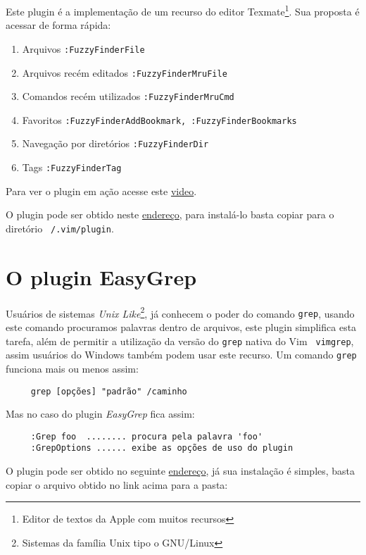 Este plugin é a implementação de um recurso do editor 
Texmate\footnote{Editor de textos da Apple com muitos recursos}.
Sua proposta é acessar de forma rápida:


\begin{enumerate}
\item Arquivos \verb|:FuzzyFinderFile|
\item Arquivos recém editados \verb|:FuzzyFinderMruFile|
\item Comandos recém utilizados \verb|:FuzzyFinderMruCmd|
\item Favoritos \verb|:FuzzyFinderAddBookmark, :FuzzyFinderBookmarks|
\item Navegação por diretórios \verb|:FuzzyFinderDir|
\item Tags {\tt :FuzzyFinderTag}
\end{enumerate}

Para ver o plugin em ação acesse este
\href{http://vimeo.com/2938498}{video}.


O plugin pode ser obtido neste
\href{http://www.vim.org/scripts/script.php?script\_id=1984}{endereço},
para instalá-lo basta copiar para o diretório 
{\tt ~/.vim/plugin}.

\section{O plugin EasyGrep}
\label{sec:O plugin EasyGrep}

Usuários de sistemas {\em Unix Like}\footnote{Sistemas da família Unix tipo o
GNU/Linux}, já conhecem o poder do comando {\tt grep}, usando este comando
procuramos palavras dentro de arquivos, este plugin simplifica esta tarefa,
além de permitir a utilização da versão do {\tt grep} nativa do Vim {\tt
vimgrep}, assim usuários do Windows também podem usar este recurso. Um comando
{\tt grep} funciona mais ou menos assim:

\begin{verbatim}
     grep [opções] "padrão" /caminho
\end{verbatim}

Mas no caso do plugin {\em EasyGrep} fica assim:

\begin{verbatim}
     :Grep foo  ........ procura pela palavra 'foo'
     :GrepOptions ...... exibe as opções de uso do plugin
\end{verbatim}


O plugin pode ser obtido no seguinte
\href{http://www.vim.org/scripts/script.php?script\_id=2438#0.9}{endereço}, já sua instalação
é simples, basta copiar o arquivo obtido no link acima para a pasta:
   
